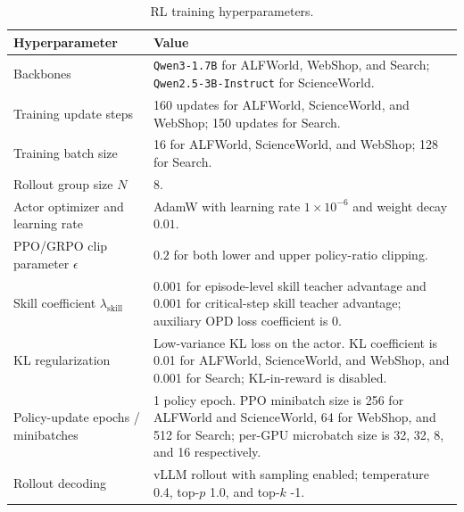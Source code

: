 \begin{table}[t]
\centering
\small
\setlength{\tabcolsep}{6pt}
\renewcommand{\arraystretch}{1.15}
\caption{RL training hyperparameters.}
\label{tab:rl_hyperparameters}
\begin{tabular}{@{}p{}p{}@{}}
\toprule
\textbf{Hyperparameter} & \textbf{Value} \\
\midrule
Backbones
& \texttt{Qwen3-1.7B} for ALFWorld, WebShop, and Search; \texttt{Qwen2.5-3B-Instruct} for ScienceWorld. \\

Training update steps
& 160 updates for ALFWorld, ScienceWorld, and WebShop; 150 updates for Search. \\

Training batch size
& 16 for ALFWorld, ScienceWorld, and WebShop; 128 for Search. \\

Rollout group size $N$
& 8. \\

Actor optimizer and learning rate
& AdamW with learning rate $1\times10^{-6}$ and weight decay $0.01$. \\

PPO/GRPO clip parameter $\epsilon$
& $0.2$ for both lower and upper policy-ratio clipping. \\

Skill coefficient $\lambda_{\mathrm{skill}}$
& $0.001$ for episode-level skill teacher advantage and $0.001$ for critical-step skill teacher advantage; auxiliary OPD loss coefficient is 0. \\

KL regularization
& Low-variance KL loss on the actor. KL coefficient is 0.01 for ALFWorld, ScienceWorld, and WebShop, and 0.001 for Search; KL-in-reward is disabled. \\

Policy-update epochs / minibatches
& 1 policy epoch. PPO minibatch size is 256 for ALFWorld and ScienceWorld, 64 for WebShop, and 512 for Search; per-GPU microbatch size is 32, 32, 8, and 16 respectively. \\

Rollout decoding
& vLLM rollout with sampling enabled; temperature 0.4, top-$p$ 1.0, and top-$k$ -1. \\


\end{tabular}
\end{table}
